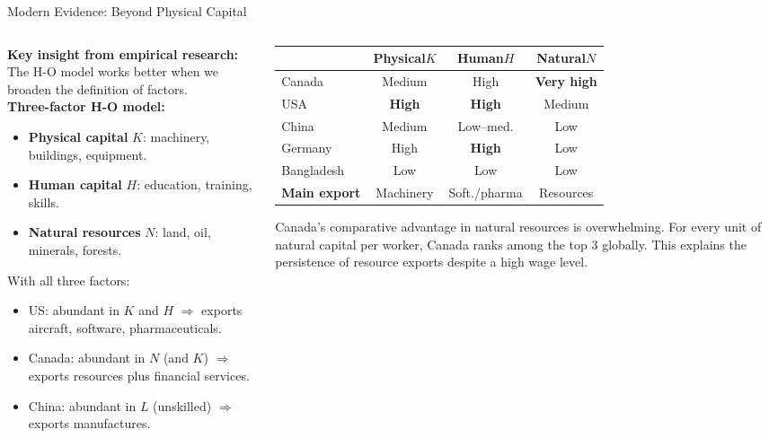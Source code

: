 \documentclass[aspectratio=169]{beamer}
\begin{document}
\begin{frame}[shrink=5]{Modern Evidence: Beyond Physical Capital}
\begin{columns}[T]
\begin{column}{0.50\textwidth}
\textbf{Key insight from empirical research:}
The H-O model works better when we broaden
the definition of factors.\\[0.4em]
\textbf{Three-factor H-O model:}
\begin{itemize}\small
  \item \textbf{Physical capital} $K$: machinery,
        buildings, equipment.
  \item \textbf{Human capital} $H$: education,
        training, skills.
  \item \textbf{Natural resources} $N$: land,
        oil, minerals, forests.
\end{itemize}
\vspace{0.3em}
With all three factors:
\begin{itemize}\small
  \item US: abundant in $K$ and $H$
        $\Rightarrow$ exports aircraft, software,
        pharmaceuticals.
  \item Canada: abundant in $N$ (and $K$)
        $\Rightarrow$ exports resources plus
        financial services.
  \item China: abundant in $L$ (unskilled)
        $\Rightarrow$ exports manufactures.
\end{itemize}
\end{column}
\begin{column}{0.47\textwidth}
\begin{adjustbox}{max width=\columnwidth}
\begin{tabular}{lccc}
\toprule
& \textbf{Physical}$K$ & \textbf{Human}$H$ &
  \textbf{Natural}$N$\\
\midrule
Canada & Medium & High & \textbf{Very high}\\
USA & \textbf{High} & \textbf{High} & Medium\\
China & Medium & Low--med. & Low\\
Germany & High & \textbf{High} & Low\\
Bangladesh & Low & Low & Low\\
\midrule
\textbf{Main export} & Machinery & Soft./pharma &
  Resources\\
\bottomrule
\end{tabular}
\end{adjustbox}
\vspace{0.4em}
\begin{canadex}
\small Canada's comparative advantage in natural
resources is overwhelming. For every unit of natural
capital per worker, Canada ranks among the top 3
globally. This explains the persistence of resource
exports despite a high wage level.
\end{canadex}
\end{column}
\end{columns}
\end{frame}
\end{document}
